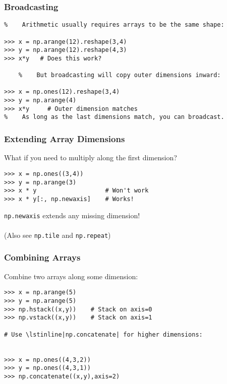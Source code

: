 \begin{frame}[fragile]\frametitle{Broadcasting}

    \begin{lstlisting}
%    Arithmetic usually requires arrays to be the same shape:
	
>>> x = np.arange(12).reshape(3,4)
>>> y = np.arange(12).reshape(4,3)
>>> x*y   # Does this work?

	%    But broadcasting will copy outer dimensions inward:

>>> x = np.ones(12).reshape(3,4)
>>> y = np.arange(4)
>>> x*y     # Outer dimension matches
%    As long as the last dimensions match, you can broadcast.

    \end{lstlisting}
\end{frame}

\begin{frame}[fragile]\frametitle{Extending Array Dimensions}

    What if you need to multiply along the first dimension?
    \begin{lstlisting}
>>> x = np.ones((3,4))
>>> y = np.arange(3)
>>> x * y                   # Won't work
>>> x * y[:, np.newaxis]    # Works!
    \end{lstlisting}
    \lstinline|np.newaxis| extends any missing dimension!
    \\~\\
    (Also see \lstinline|np.tile| and \lstinline|np.repeat|)
\end{frame}

\begin{frame}[fragile]\frametitle{Combining Arrays}

    Combine two arrays along some dimension:
    \begin{lstlisting}
>>> x = np.arange(5)
>>> y = np.arange(5)
>>> np.hstack((x,y))    # Stack on axis=0
>>> np.vstack((x,y))    # Stack on axis=1

# Use \lstinline|np.concatenate| for higher dimensions:


>>> x = np.ones((4,3,2))
>>> y = np.ones((4,3,1))
>>> np.concatenate((x,y),axis=2)
    \end{lstlisting}
\end{frame}

